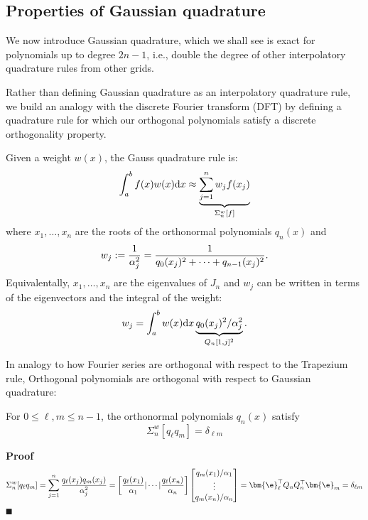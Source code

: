 \subsection{Properties of Gaussian quadrature}
We now introduce Gaussian quadrature, which we shall see is exact for polynomials up to degree $2n-1$, i.e., double the degree of other interpolatory quadrature rules from other grids.

Rather than defining Gaussian quadrature as an interpolatory quadrature rule, we build an analogy with the discrete Fourier transform (DFT) by defining a quadrature rule for which our orthogonal polynomials satisfy a discrete orthogonality property.

\begin{definition} Given a weight $w(x)$, the Gauss quadrature rule is:
\[
\ensuremath{\int}_a^b f(x)w(x) {\rm d}x \ensuremath{\approx} \underbrace{\ensuremath{\sum}_{j=1}^n w_j f(x_j)}_{\ensuremath{\Sigma}_n^w[f]}
\]
where $x_1,\ensuremath{\ldots},x_n$ are the roots of the orthonormal polynomials $q_n(x)$ and 
\[
w_j := {1 \over \ensuremath{\alpha}_j^2} = {1 \over q_0(x_j)^2 + \ensuremath{\cdots} + q_{n-1}(x_j)^2}.
\]
Equivalentally, $x_1,\ensuremath{\ldots},x_n$ are the eigenvalues of $J_n$ and $w_j$ can be written in terms of the eigenvectors and the integral of the weight:
\[
w_j = \ensuremath{\int}_a^b w(x) {\rm d}x \underbrace{q_0(x_j)^2/\ensuremath{\alpha}_j^2}_{Q_n[1,j]^2}.
\]
\end{definition}

In analogy to how Fourier series are orthogonal with respect to the Trapezium rule, Orthogonal polynomials are orthogonal with respect to Gaussian quadrature:

\begin{lemma} For $0 \ensuremath{\leq} \ensuremath{\ell},m \ensuremath{\leq} n-1$, the orthonormal polynomials $q_n(x)$ satisfy
\[
\ensuremath{\Sigma}_n^w[q_\ensuremath{\ell} q_m] = \ensuremath{\delta}_{\ensuremath{\ell}m}
\]
\end{lemma}
\textbf{Proof}
\[
\ensuremath{\Sigma}_n^w[q_\ensuremath{\ell} q_m] = \ensuremath{\sum}_{j=1}^n {q_\ensuremath{\ell}(x_j) q_m(x_j) \over \ensuremath{\alpha}_j^2}
= \left[{q_\ensuremath{\ell}(x_1)\over \ensuremath{\alpha}_1} | \ensuremath{\cdots} | {q_\ensuremath{\ell}(x_n) \over \ensuremath{\alpha}_n}\right] 
\begin{bmatrix}
q_m(x_1)/\ensuremath{\alpha}_1 \\
\ensuremath{\vdots} \\
q_m(x_n)/\ensuremath{\alpha}_n \end{bmatrix} = \ensuremath{\bm{\e}}_\ensuremath{\ell}^\ensuremath{\top} Q_n Q_n^\ensuremath{\top} \ensuremath{\bm{\e}}_m = \ensuremath{\delta}_{\ensuremath{\ell}m}
\]
\ensuremath{\QED}

